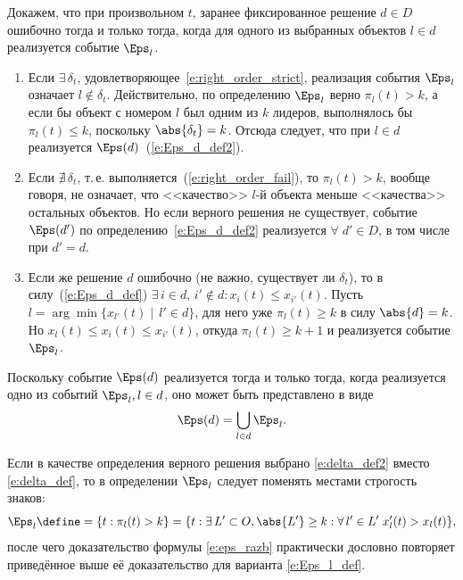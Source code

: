 Докажем, что при произвольном $t$, заранее фиксированное решение $d \in D$ ошибочно тогда и только тогда, когда для одного из выбранных объектов $l \in d$ реализуется событие $\Eps_l$.
\begin{enumerate}
  \item Если $\exists\, \delta_t$, удовлетворяющее~\eqref{e:right_order_strict}, реализация события $\Eps_l$ означает $l \notin \delta_t$.
  Действительно, по определению $\Eps_l$ верно $\pi_l(t) > k$, а если бы объект с номером $l$ был одним из $k$ лидеров, выполнялось бы $\pi_l(t) \leq k$, поскольку $\abs{\delta_t} = k$. Отсюда следует, что при $l \in d$ реализуется $\Eps(d)$~(\ref{e:Eps_d_def2}).
  \item Если $\nexists\, \delta_t$, т.\,е. выполняется~(\ref{e:right_order_fail}), то $\pi_l(t) > k$, вообще говоря, не означает, что <<качество>> $l$-й объекта меньше <<качества>> остальных объектов. Но если верного решения не существует, событие $\Eps(d')$ по определению~\eqref{e:Eps_d_def2} реализуется $\forall\; d' \in D$, в том числе при $d' = d$. 
  \item Если же решение $d$ ошибочно (не важно, существует ли $\delta_t$), то в силу~(\ref{e:Eps_d_def}) $\exists\, i \in d,\, i' \notin d: x_i(t) \leq x_{i'}(t)$. %
  Пусть $l = \arg\min \{x_{l'}(t)\mid\,l' \in d\}$, для него уже $\pi_l(t) \geq k$ в силу $\abs{d} = k$. Но $x_l(t) \leq x_i(t) \leq x_{i'}(t)$, откуда $\pi_l(t) \geq k+1$ и реализуется событие $\Eps_l$.     
\end{enumerate}

Поскольку событие $\Eps(d)$ реализуется тогда и только тогда, когда реализуется одно из событий $\Eps_l, l \in d$, оно может быть представлено в виде
\begin{equation}
  \label{e:eps_razb}
  \Eps(d) = \bigcup_{l \in d} \Eps_l.
\end{equation}

\noticeheader
\begin{notice}
Если в качестве определения верного решения выбрано \eqref{e:delta_def2} вместо \eqref{e:delta_def}, то в определении $\Eps_l$ следует поменять местами строгость знаков:
\begin{equation*}
  \Eps_l \define= \{t: \pi_l(t) > k\} = \{t: \exists\, L' \subset O, \abs{L'} \geq k: \forall\, l' \in L'\;x_l'(t) > x_{l}(t)\},
\end{equation*}
после чего доказательство формулы \eqref{e:eps_razb} практически дословно повторяет приведённое выше её доказательство для варианта \eqref{e:Eps_l_def}.
\end{notice}

